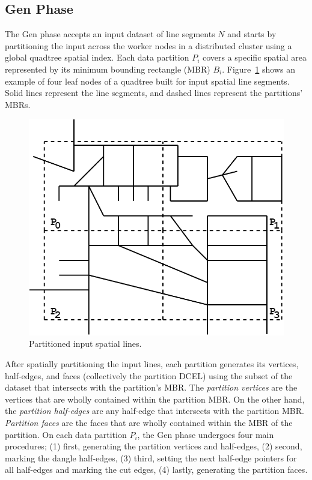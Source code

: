 \subsection{Gen Phase}
\label{sec:gen}

The Gen phase accepts an input dataset of line segments $N$ and starts by partitioning the input across the worker nodes in a distributed cluster using a global quadtree spatial index.
Each data partition $P_i$ covers a specific spatial area represented by its minimum bounding rectangle (MBR) $B_i$.
Figure~\ref{fig:ddcel:input} shows an example of four leaf nodes of a quadtree built for input spatial line segments. Solid lines represent the line segments, and dashed lines represent the partitions' MBRs.

\begin{figure}[tb]
	\centering
	\includegraphics[width=0.75 \linewidth ]{chapter2/model/input-network.png}
	\caption{Partitioned input spatial lines.}
	\label{fig:ddcel:input}
\end{figure}

After spatially partitioning the input lines, each partition generates its vertices, half-edges, and faces (collectively the partition DCEL) using the subset of the dataset that intersects with the partition's MBR.
The \textit{partition vertices} are the vertices that are wholly contained within the partition MBR. 
On the other hand, the \textit{partition half-edges} are any half-edge that intersects with the partition MBR.
\textit{Partition faces} are the faces that are wholly contained within the MBR of the partition.
On each data partition $P_i$, the Gen phase undergoes four main procedures; 
(1) first, generating the partition vertices and half-edges, 
(2) second, marking the dangle half-edges, 
(3) third, setting the next half-edge pointers for all half-edges and marking the cut edges, 
(4) lastly, generating the partition faces. 

